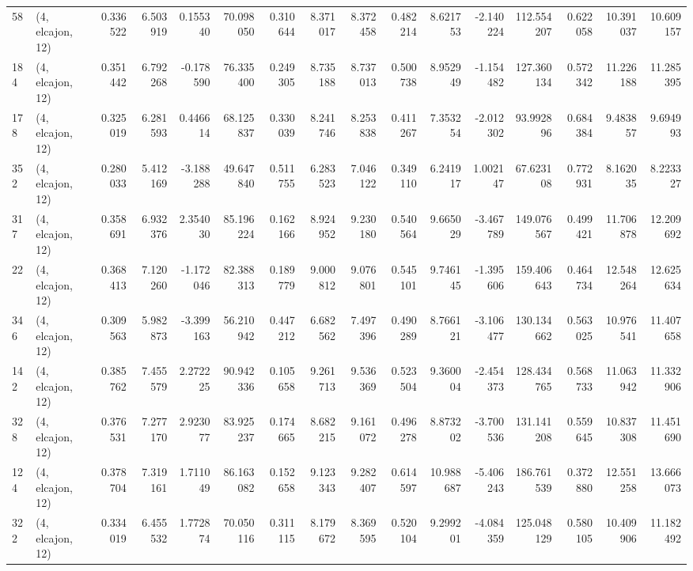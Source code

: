 \begin{tabular}{llrrrrrrrrrrrrrr}
58  &  (4, elcajon, 12) &   0.336522 &   6.503919 &   0.155340 &    70.098050 &   0.310644 &   8.371017 &   8.372458 &  0.482214 &   8.621753 &  -2.140224 &    112.554207 &   0.622058 &  10.391037 &   10.609157 \\
184 &  (4, elcajon, 12) &   0.351442 &   6.792268 &  -0.178590 &    76.335400 &   0.249305 &   8.735188 &   8.737013 &  0.500738 &   8.952949 &  -1.154482 &    127.360134 &   0.572342 &  11.226188 &   11.285395 \\
178 &  (4, elcajon, 12) &   0.325019 &   6.281593 &   0.446614 &    68.125837 &   0.330039 &   8.241746 &   8.253838 &  0.411267 &   7.353254 &  -2.012302 &     93.992896 &   0.684384 &   9.483857 &    9.694993 \\
352 &  (4, elcajon, 12) &   0.280033 &   5.412169 &  -3.188288 &    49.647840 &   0.511755 &   6.283523 &   7.046122 &  0.349110 &   6.241917 &   1.002147 &     67.623108 &   0.772931 &   8.162035 &    8.223327 \\
317 &  (4, elcajon, 12) &   0.358691 &   6.932376 &   2.354030 &    85.196224 &   0.162166 &   8.924952 &   9.230180 &  0.540564 &   9.665029 &  -3.467789 &    149.076567 &   0.499421 &  11.706878 &   12.209692 \\
22  &  (4, elcajon, 12) &   0.368413 &   7.120260 &  -1.172046 &    82.388313 &   0.189779 &   9.000812 &   9.076801 &  0.545101 &   9.746145 &  -1.395606 &    159.406643 &   0.464734 &  12.548264 &   12.625634 \\
346 &  (4, elcajon, 12) &   0.309563 &   5.982873 &  -3.399163 &    56.210942 &   0.447212 &   6.682562 &   7.497396 &  0.490289 &   8.766121 &  -3.106477 &    130.134662 &   0.563025 &  10.976541 &   11.407658 \\
142 &  (4, elcajon, 12) &   0.385762 &   7.455579 &   2.272225 &    90.942336 &   0.105658 &   9.261713 &   9.536369 &  0.523504 &   9.360004 &  -2.454373 &    128.434765 &   0.568733 &  11.063942 &   11.332906 \\
328 &  (4, elcajon, 12) &   0.376531 &   7.277170 &   2.923077 &    83.925237 &   0.174665 &   8.682215 &   9.161072 &  0.496278 &   8.873202 &  -3.700536 &    131.141208 &   0.559645 &  10.837308 &   11.451690 \\
124 &  (4, elcajon, 12) &   0.378704 &   7.319161 &   1.711049 &    86.163082 &   0.152658 &   9.123343 &   9.282407 &  0.614597 &  10.988687 &  -5.406243 &    186.761539 &   0.372880 &  12.551258 &   13.666073 \\
322 &  (4, elcajon, 12) &   0.334019 &   6.455532 &   1.772874 &    70.050116 &   0.311115 &   8.179672 &   8.369595 &  0.520104 &   9.299201 &  -4.084359 &    125.048129 &   0.580105 &  10.409906 &   11.182492 \\

\end{tabular}
